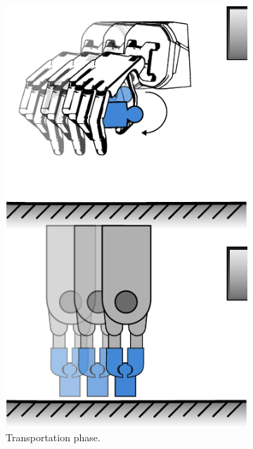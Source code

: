 \begin{figure}[h]
\begin{subfigure}[b]{0.24\textwidth}
		\includegraphics[width=\textwidth]{chapters/introduction/fig/pipeline-3.pdf}
		\caption{Transportation phase.}
		\label{fig:transportation-phase}
	\end{subfigure}
	\hfill
	\begin{subfigure}[b]{0.24\textwidth}
		\centering

\end{subfigure}
\end{figure}
